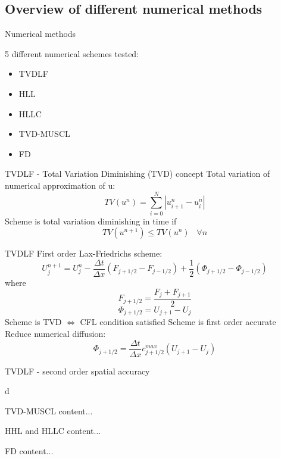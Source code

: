 \subsection{Overview of different numerical methods}
\begin{frame}{Numerical methods}

5 different numerical schemes tested:
\begin{itemize}
  	\item TVDLF
  	\item  HLL
  	\item HLLC
  	\item TVD-MUSCL 
  	\item FD
\end{itemize}

\end{frame}



\begin{frame}{TVDLF - Total Variation Diminishing (TVD) concept}
	Total variation of numerical approximation of u:
	\begin{equation*}
		TV(u^n) = \sum_{i=0}^{N} |u_{i+1}^n-u_i^n|
	\end{equation*}
	Scheme is total variation diminishing in time if
	\begin{equation*}
		TV(u^{n+1}) \leq TV(u^{n}) \; \; \; \forall n
	\end{equation*}
\end{frame}


\begin{frame}{TVDLF}
	First order Lax-Friedrichs scheme:
	\begin{equation*}
		U_j^{n+1} = U_j^n - \frac{\Delta t}{\Delta x} \left( F_{j+1/2} - F_{j-1/2} \right) + \frac{1}{2} \left( \Phi_{j+1/2} - \Phi_{j-1/2} \right)
	\end{equation*}
	where
	\begin{equation*}
		F_{j+1/2} = \frac{F_j + F_{j+1}}{2}
	\end{equation*}
	\begin{equation*}
		\Phi_{j+1/2} = U_{j+1}-U_j
	\end{equation*}
	Scheme is TVD $\Leftrightarrow$ CFL condition satisfied \newline
	Scheme is first order accurate \newline
	Reduce numerical diffusion:
	\begin{equation*}
		\Phi_{j+1/2} = \frac{\Delta t}{\Delta x} c_{j+1/2}^{max} \left( U_{j+1}-U_j \right)
	\end{equation*}
\end{frame}
	
	
\begin{frame}{TVDLF - second order spatial accuracy}
	
	d
	

\end{frame}

\begin{frame}{TVD-MUSCL}
content...
\end{frame}

\begin{frame}{HHL and HLLC}
content...
\end{frame}

\begin{frame}{FD}
content...
\end{frame}